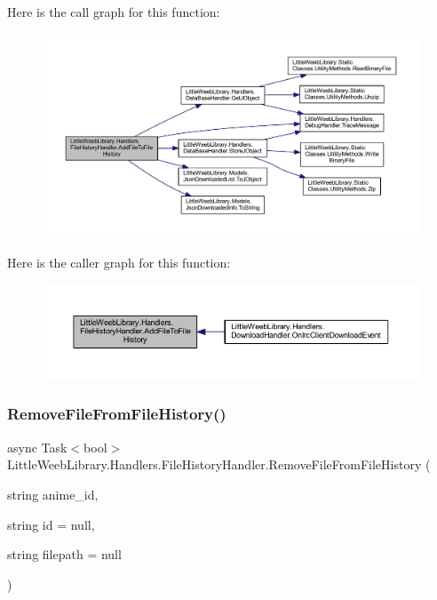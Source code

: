 Here is the call graph for this function\+:\nopagebreak
\begin{figure}[H]
\begin{center}
\leavevmode
\includegraphics[width=350pt]{class_little_weeb_library_1_1_handlers_1_1_file_history_handler_a615bf14eae35f656b211f0500abe4d29_cgraph}
\end{center}
\end{figure}
Here is the caller graph for this function\+:\nopagebreak
\begin{figure}[H]
\begin{center}
\leavevmode
\includegraphics[width=350pt]{class_little_weeb_library_1_1_handlers_1_1_file_history_handler_a615bf14eae35f656b211f0500abe4d29_icgraph}
\end{center}
\end{figure}
\mbox{\label{class_little_weeb_library_1_1_handlers_1_1_file_history_handler_a3b3f0cdedee405d607feff81c2de085d}} 
\subsubsection{\texorpdfstring{Remove\+File\+From\+File\+History()}{RemoveFileFromFileHistory()}}
{\footnotesize\ttfamily async Task$<$bool$>$ Little\+Weeb\+Library.\+Handlers.\+File\+History\+Handler.\+Remove\+File\+From\+File\+History (\begin{DoxyParamCaption}\item[{string}]{anime\+\_\+id,  }\item[{string}]{id = {\ttfamily null},  }\item[{string}]{filepath = {\ttfamily null} }\end{DoxyParamCaption})}



